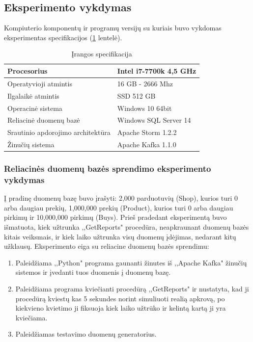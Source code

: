 \documentclass{VUMIFPSkursinis}
\begin{document}
\subsection{Eksperimento vykdymas}
Kompiuterio komponentų ir programų versijų su kuriais buvo vykdomas eksperimentas specifikacijos (\ref{table:hardware} lentelė).
\begin{table}[!htbp]
    \begin{center}
        \caption{Įrangos specifikacija}
        \label{table:hardware}
        \begin{tabular}{ | l | l |  } 
            \hline
            Procesorius & Intel i7-7700k 4,5 GHz \\* \hline
            Operatyvioji atmintis & 16 GB - 2666 Mhz \\* \hline
            Ilgalaikė atmintis & SSD 512 GB \\* \hline
            Operacinė sistema & Windows 10 64bit \\* \hline
            Reliacinė duomenų bazė & Windows SQL Server 14 \\* \hline
            Srautinio apdorojimo architektūra & Apache Storm 1.2.2 \\* \hline
            Žinučių sistema & Apache Kafka 1.1.0 \\* \hline
        \end{tabular}
    \end{center}
\end{table}\par

\subsubsection{Reliacinės duomenų bazės sprendimo eksperimento vykdymas}
Į pradinę duomenų bazę buvo įrašyti: 2,000 parduotuvių (Shop), kurios turi 0 arba daugiau prekių, 1,000,000 prekių (Product), kurios turi 0 arba daugiau pirkimų ir 10,000,000 pirkimų (Buys).
Prieš pradedant eksperimentą buvo išmatuota, kiek užtrunka ,,GetReports" procedūra, neapkraunant duomenų bazės kitais veiksmais, ir kiek laiko užtrunka visų duomenų įdėjimas,
nedarant kitų užklausų. 
Eksperimento eiga su reliacine duomenų bazės sprendimu:
\begin{enumerate} 
\item Paleidžiama ,,Python" programa gaunanti žinutes iš ,,Apache Kafka" žinučių sistemos ir įvedanti tuos duomenis į duomenų bazę. 
\item Paleidžiama programa kviečianti procedūrą ,,GetReports" ir nustatyta, kad ji procedūrą kviestų kas 5 sekundes norint simuliuoti realią apkrovą,
po kiekvieno kvietimo ji fiksuoja kiek laiko užtrūko ir kelintą kartą ji yra kviečiama. 
\item Paleidžiamas testavimo duomenų generatorius.
\end{enumerate}
\end{document}
